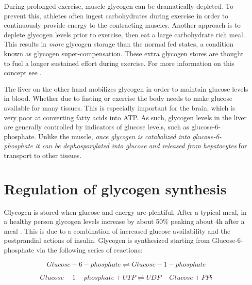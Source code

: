 \documentclass{tufte-handout}
\begin{document}
  During prolonged exercise, muscle glycogen can be dramatically depleted.  To prevent this, athletes often ingest carbohydrates during exercise in order to continuously provide energy to the contracting muscles.  Another approach is to deplete glycogen levels prior to exercise, then eat a large carbohydrate rich meal.  This results in \emph{more} glycogen storage than the normal fed states, a condition known as glycogen super-compensation.  These extra glycogen stores are thought to fuel a longer sustained effort during exercise.  For more information on this concept see \citet{Hawley1997}.  

  The liver on the other hand mobilizes glycogen in order to maintain glucose levels in blood.  Whether due to fasting or exercise the body needs to make glucose available for many tissues.  This is especially important for the brain, which is very poor at converting fatty acids into ATP.  As such, glycogen levels in the liver are generally controlled by indicators of glucose levels, such as glucose-6-phosphate.  Unlike the muscle, \emph{once glycogen is catabolized into glucose-6-phosphate it can be dephosporylated into glucose and released from hepatocytes} for transport to other tissues.

\section{Regulation of glycogen synthesis}

Glycogen is stored when glucose and energy are plentiful.  After a typical meal, in a healthy person glycogen levels increase by about 50\% peaking about 4h after a meal \citep{Taylor1996a}.  This is due to a combination of increased glucose availability and the postprandial actions of insulin.  Glycogen is synthesized starting from Glucose-6-phosphate via the following series of reactions:

\begin{equation}
Glucose-6-phosphate \rightleftharpoons Glucose-1-phosphate
\end{equation}

\begin{equation}
Glucose-1-phosphate + UTP \rightleftharpoons UDP-Glucose + PPi
\end{equation}
\end{document}
